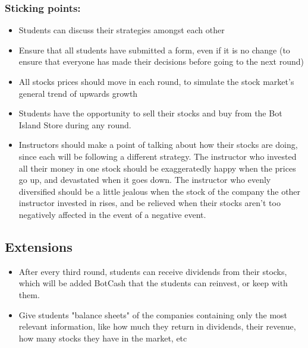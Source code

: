 \documentclass{lessonplan}
\begin{document}
      \subsubsection{Sticking points:}
      \begin{itemize}
        \item Students can discuss their strategies amongst each other
        \item Ensure that all students have submitted a form, even if it is no change (to ensure that everyone has 
                 made their decisions before going to the next round)
        \item All stocks prices should move in each round, to simulate the stock market's general trend of upwards growth
        \item Students have the opportunity to sell their stocks and buy from the Bot Island Store during any round. 
        \item Instructors should make a point of talking about how their stocks are doing, since each will be
                 following a different strategy. The instructor who invested all their money in one stock should be 
                 exaggeratedly happy when the prices go up, and devastated when it goes down. The instructor
                 who evenly diversified should be a little jealous when the stock of the company the other instructor 
                 invested in rises, and be relieved when their stocks aren't too negatively affected in the event of a negative event. 
      \end{itemize}
    \subsection{Extensions}
      \begin{itemize}
        \item After every third round, students can receive dividends from their stocks, which will be added BotCash 
                 that the students can reinvest, or keep with them.
        \item Give students "balance sheets" of the companies containing only the most relevant information, 
                 like how much they return in dividends, their revenue, how many stocks they have in the market, etc
      \end{itemize}
\end{document}
